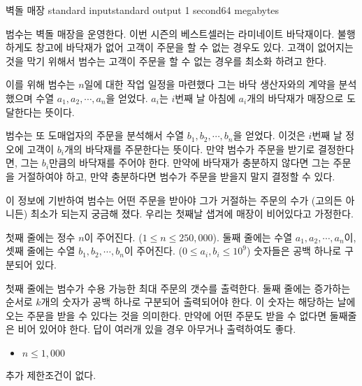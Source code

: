 \begin{problem}{벽돌 매장}
	{standard input}{standard output}
	{1 second}{64 megabytes}{}
	
	범수는 벽돌 매장을 운영한다. 이번 시즌의 베스트셀러는 라미네이트 바닥재이다. 불행하게도 창고에 바닥재가 없어 고객이 주문을 할 수 없는 경우도 있다. 고객이 없어지는것을 막기 위해서 범수는 고객이 주문을 할 수 없는 경우를 최소화 하려고 한다.
	
	이를 위해 범수는 $n$일에 대한 작업 일정을 마련했다 그는 바닥 생산자와의 계약을 분석 했으며 수열 $a_1, a_2, \cdots, a_n$을 얻었다. $a_i$는 $i$번째 날 아침에 $a_i$개의 바닥재가 매장으로 도달한다는 뜻이다.
 
	범수는 또 도매업자의 주문을 분석해서 수열 $b_1, b_2, \cdots, b_n$을 얻었다. 이것은 $i$번째 날 정오에 고객이 $b_i$개의 바닥재를 주문한다는 뜻이다. 만약 범수가 주문을 받기로 결정한다면, 그는 $b_i$만큼의 바닥재를 주어야 한다. 만약에 바닥재가 충분하지 않다면 그는 주문을 거절하여야 하고, 만약 충분하다면 범수가 주문을 받을지 말지 결정할 수 있다.
	
	이 정보에 기반하여 범수는 어떤 주문을 받아야 그가 거절하는 주문의 수가 (고의든 아니든) 최소가 되는지 궁금해 졌다. 우리는 첫째날 샙겨에 매장이 비어있다고 가정한다.

	

	\InputFile
	
	첫째 줄에는 정수 $n$이 주어진다. ($1 \le n \le 250,000$). 둘째 줄에는 수열 $a_1 , a_2, \cdots, a_n$이, 셋째 줄에는 수열 $b_1, b_2, \cdots, b_n$이 주어진다. ($0 \le a_i, b_i \le 10^9$) 숫자들은 공백 하나로 구분되어 있다.
 
	
	\OutputFile
	
	첫째 줄에는 범수가 수용 가능한 최대 주문의 갯수를 출력한다. 둘째 줄에는 증가하는 순서로 $k$개의 숫자가 공백 하나로 구분되어 출력되어야 한다. 이 숫자는 해당하는 날에 오는 주문을 받을 수 있다는 것을 의미한다. 만약에 어떤 주문도 받을 수 없다면 둘째줄은 비어 있어야 한다. 답이 여러개 있을 경우 아무거나 출력하여도 좋다. 
	
	\begin{itemize}
		\item $n \le 1,000$
	\end{itemize}
	
	
	추가 제한조건이 없다.
	
	\Examples
		
	\begin{example}
	\end{example}
	
	\Note
	
\end{problem}

